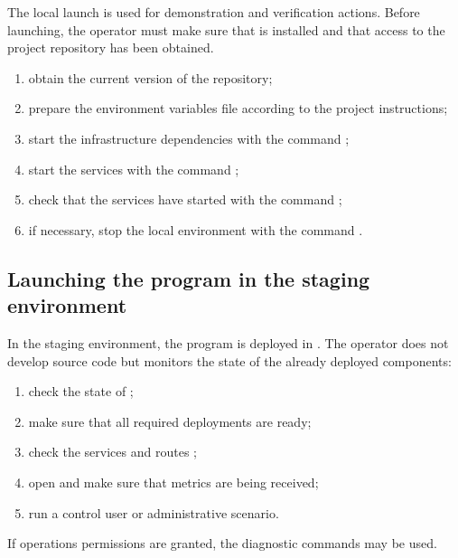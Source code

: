 \documentclass[12pt,a4paper]{extarticle}
\begin{document}
\begin{hseExample}
The local launch is used for demonstration and verification actions. Before launching, the operator must make sure that  is installed and that access to the project repository has been obtained.

\begin{enumerate}[label=\arabic*), leftmargin=1.25cm]
    \item obtain the current version of the repository;
    \item prepare the environment variables file according to the project instructions;
    \item start the infrastructure dependencies with the command ;
    \item start the services with the command ;
    \item check that the services have started with the command ;
    \item if necessary, stop the local environment with the command .
\end{enumerate}
\end{hseExample}

\subsection{Launching the program in the staging environment}

\begin{hseExample}
In the staging environment, the program is deployed in . The operator does not develop source code but monitors the state of the already deployed components:

\begin{enumerate}[label=\arabic*), leftmargin=1.25cm]
    \item check the state of ;
    \item make sure that all required deployments are ready;
    \item check the services and routes ;
    \item open  and make sure that metrics are being received;
    \item run a control user or administrative scenario.
\end{enumerate}

If operations permissions are granted, the diagnostic commands  may be used.
\end{hseExample}
\end{document}
